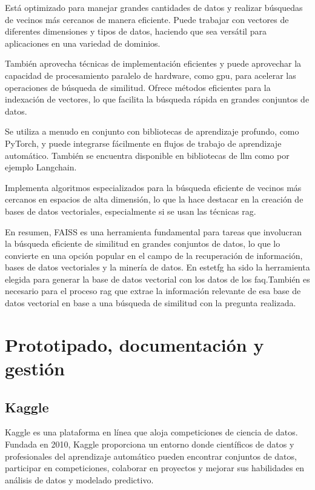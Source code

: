 Está optimizado para manejar grandes cantidades de datos y realizar búsquedas de vecinos más cercanos de manera eficiente. Puede trabajar con vectores de diferentes dimensiones y tipos de datos, haciendo que sea versátil para aplicaciones en una variedad de dominios.

También aprovecha técnicas de implementación eficientes y puede aprovechar la capacidad de procesamiento paralelo de hardware, como \acrshort{gpu}, para acelerar las operaciones de búsqueda de similitud. Ofrece métodos eficientes para la indexación de vectores, lo que facilita la búsqueda rápida en grandes conjuntos de datos.

Se utiliza a menudo en conjunto con bibliotecas de aprendizaje profundo, como PyTorch, y puede integrarse fácilmente en flujos de trabajo de aprendizaje automático. También se encuentra disponible en bibliotecas de \acrshort{llm} como por ejemplo Langchain. 

Implementa algoritmos especializados para la búsqueda eficiente de vecinos más cercanos en espacios de alta dimensión, lo que la hace destacar en la creación de bases de datos vectoriales, especialmente si se usan las técnicas \acrshort{rag}.

En resumen, FAISS es una herramienta fundamental para tareas que involucran la búsqueda eficiente de similitud en grandes conjuntos de datos, lo que lo convierte en una opción popular en el campo de la recuperación de información, bases de datos vectoriales y la minería de datos. En este\acrshort{tfg} ha sido la herramienta elegida para generar la base de datos vectorial con los datos de los \acrshort{faq}.También es necesario para el proceso \acrshort{rag} que extrae la información relevante de esa base de datos vectorial en base a una búsqueda de similitud con la pregunta realizada.


\section{Prototipado, documentación y gestión}

\subsection{Kaggle}

Kaggle es una plataforma en línea que aloja competiciones de ciencia de datos. Fundada en 2010, Kaggle proporciona un entorno donde científicos de datos y profesionales del aprendizaje automático pueden encontrar conjuntos de datos, participar en competiciones, colaborar en proyectos y mejorar sus habilidades en análisis de datos y modelado predictivo.

